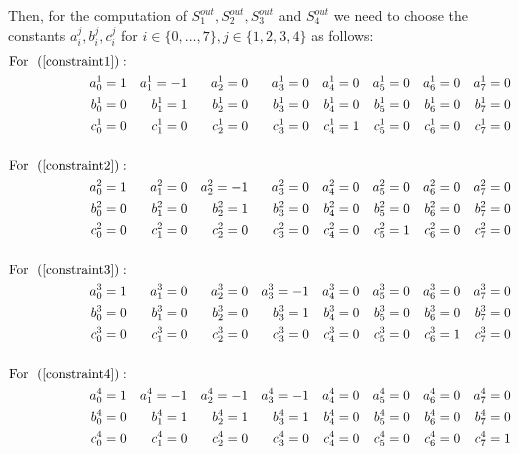 Then, for the computation of $S_1^{out}, S_2^{out}, S_3^{out}$ and $S_4^{out}$ we need to choose the constants $a_i^j, b_i^j, c_i^j$ for $i\in\{0,\dots, 7\}, j\in\{1,2,3,4\}$ as follows:
\begin{align*}
    \text{For } \text{ (\ref{constraint1})}:&&&&&&&&&&&&&&\\
    a_0^1=1 && a_1^1=-1 && a_2^1=0 && a_3^1=0 && a_4^1=0 && a_5^1=0 && a_6^1=0 && a_7^1=0\\
    b_0^1=0 && b_1^1=1 && b_2^1=0 && b_3^1=0 && b_4^1=0 && b_5^1=0 && b_6^1=0 && b_7^1=0\\
    c_0^1=0 && c_1^1=0 && c_2^1=0 && c_3^1=0 && c_4^1=1 && c_5^1=0 && c_6^1=0 && c_7^1=0\\
    &&&&&&&&&&&&&&\\
    \text{For } \text{ (\ref{constraint2})}:&&&&&&&&&&&&&&\\
    a_0^2=1 && a_1^2=0 && a_2^2=-1 && a_3^2=0 && a_4^2=0 && a_5^2=0 && a_6^2=0 && a_7^2=0\\
    b_0^2=0 && b_1^2=0 && b_2^2=1 && b_3^2=0 && b_4^2=0 && b_5^2=0 && b_6^2=0 && b_7^2=0\\
    c_0^2=0 && c_1^2=0 && c_2^2=0 && c_3^2=0 && c_4^2=0 && c_5^2=1 && c_6^2=0 && c_7^2=0\\
    &&&&&&&&&&&&&&\\
    \text{For } \text{ (\ref{constraint3})}:&&&&&&&&&&&&&&\\
    a_0^3=1 && a_1^3=0 && a_2^3=0 && a_3^3=-1 && a_4^3=0 && a_5^3=0 && a_6^3=0 && a_7^3=0\\
    b_0^3=0 && b_1^3=0 && b_2^3=0 && b_3^3=1 && b_4^3=0 && b_5^3=0 && b_6^3=0 && b_7^3=0\\
    c_0^3=0 && c_1^3=0 && c_2^3=0 && c_3^3=0 && c_4^3=0 && c_5^3=0 && c_6^3=1 && c_7^3=0\\
    &&&&&&&&&&&&&&\\
    \text{For } \text{ (\ref{constraint4})}:&&&&&&&&&&&&&&\\
    a_0^4=1 && a_1^4=-1 && a_2^4=-1 && a_3^4=-1 && a_4^4=0 && a_5^4=0 && a_6^4=0 && a_7^4=0\\
    b_0^4=0 && b_1^4=1 && b_2^4=1 && b_3^4=1 && b_4^4=0 && b_5^4=0 && b_6^4=0 && b_7^4=0\\
    c_0^4=0 && c_1^4=0 && c_2^4=0 && c_3^4=0 && c_4^4=0 && c_5^4=0 && c_6^4=0 && c_7^4=1\\
\end{align*}

